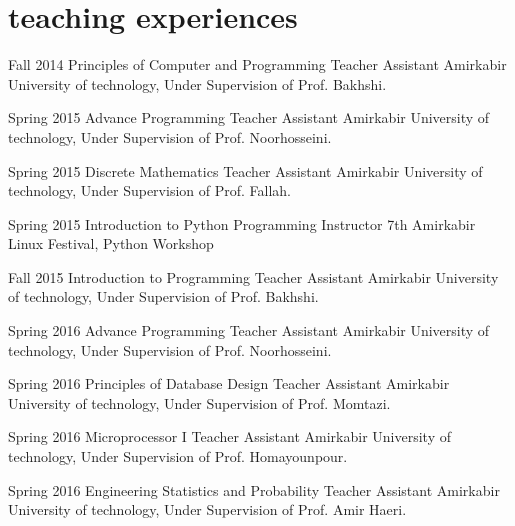 \documentclass[]{friggeri-cv} %
\begin{document}

\section{teaching experiences}

\begin{entrylist}

\entry
{Fall 2014}
{Principles of Computer and Programming}
{Teacher Assistant}
{Amirkabir University of technology, Under Supervision of Prof. Bakhshi.}


\entry
{Spring 2015}
{Advance Programming}
{Teacher Assistant}
{Amirkabir University of technology, Under Supervision of Prof. Noorhosseini.}


\entry
{Spring 2015}
{Discrete Mathematics}
{Teacher Assistant}
{Amirkabir University of technology, Under Supervision of Prof. Fallah.}


\entry
{Spring 2015}
{Introduction to Python Programming}
{Instructor}
{7th Amirkabir Linux Festival, Python Workshop}



\entry
{Fall 2015}
{Introduction to Programming}
{Teacher Assistant}
{Amirkabir University of technology, Under Supervision of Prof. Bakhshi.}


\entry
{Spring 2016}
{Advance Programming}
{Teacher Assistant}
{Amirkabir University of technology, Under Supervision of Prof. Noorhosseini.}


\entry
{Spring 2016}
{Principles of Database Design}
{Teacher Assistant}
{Amirkabir University of technology, Under Supervision of Prof. Momtazi.}


\entry
{Spring 2016}
{Microprocessor I}
{Teacher Assistant}
{Amirkabir University of technology, Under Supervision of Prof. Homayounpour.}


\entry
{Spring 2016}
{Engineering Statistics and Probability}
{Teacher Assistant}
{Amirkabir University of technology, Under Supervision of Prof. Amir Haeri.}



\end{entrylist}
\end{document}
